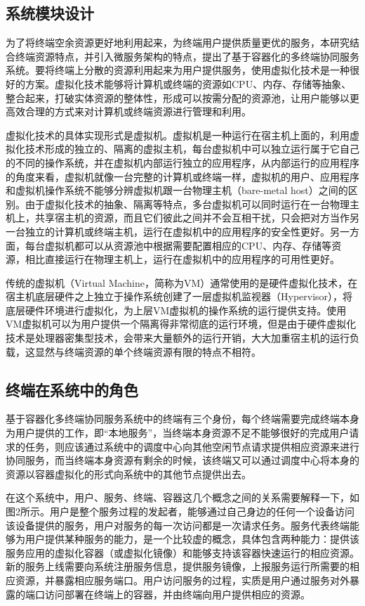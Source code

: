 \subsection{系统模块设计}
为了将终端空余资源更好地利用起来，为终端用户提供质量更优的服务，本研究结合终端资源特点，并引入微服务架构的特点，提出了基于容器化的多终端协同服务系统。要将终端上分散的资源利用起来为用户提供服务，使用虚拟化技术是一种很好的方案。虚拟化技术能够将计算机或终端的资源如CPU、内存、存储等抽象、整合起来，打破实体资源的整体性，形成可以按需分配的资源池，让用户能够以更高效合理的方式来对计算机或终端资源进行管理和利用。

虚拟化技术的具体实现形式是虚拟机。虚拟机是一种运行在宿主机上面的，利用虚拟化技术形成的独立的、隔离的虚拟主机，每台虚拟机中可以独立运行属于它自己的不同的操作系统，并在虚拟机内部运行独立的应用程序，从内部运行的应用程序的角度来看，虚拟机就像一台完整的计算机或终端一样，虚拟机的用户、应用程序和虚拟机操作系统不能够分辨虚拟机跟一台物理主机（bare-metal host）之间的区别。由于虚拟化技术的抽象、隔离等特点，多台虚拟机可以同时运行在一台物理主机上，共享宿主机的资源，而且它们彼此之间并不会互相干扰，只会把对方当作另一台独立的计算机或终端主机，运行在虚拟机中的应用程序的安全性更好。另一方面，每台虚拟机都可以从资源池中根据需要配置相应的CPU、内存、存储等资源，相比直接运行在物理主机上，运行在虚拟机中的应用程序的可用性更好。

传统的虚拟机（Virtual Machine，简称为VM）通常使用的是硬件虚拟化技术，在宿主机底层硬件之上独立于操作系统创建了一层虚拟机监视器（Hypervisor），将底层硬件环境进行虚拟化，为上层VM虚拟机的操作系统的运行提供支持。使用VM虚拟机可以为用户提供一个隔离得非常彻底的运行环境，但是由于硬件虚拟化技术是处理器密集型技术，会带来大量额外的运行开销，大大加重宿主机的运行负载，这显然与终端资源的单个终端资源有限的特点不相符。

\subsection{终端在系统中的角色}

基于容器化多终端协同服务系统中的终端有三个身份，每个终端需要完成终端本身为用户提供的工作，即“本地服务”，当终端本身资源不足不能够很好的完成用户请求的任务，则应该通过系统中的调度中心向其他空闲节点请求提供相应资源来进行协同服务，而当终端本身资源有剩余的时候，该终端又可以通过调度中心将本身的资源以容器虚拟化的形式向系统中的其他节点提供出去。

在这个系统中，用户、服务、终端、容器这几个概念之间的关系需要解释一下，如图2所示。用户是整个服务过程的发起者，能够通过自己身边的任何一个设备访问该设备提供的服务，用户对服务的每一次访问都是一次请求任务。服务代表终端能够为用户提供某种服务的能力，是一个比较虚的概念，具体包含两种能力：提供该服务应用的虚拟化容器（或虚拟化镜像）和能够支持该容器快速运行的相应资源。新的服务上线需要向系统注册服务信息，提供服务镜像，上报服务运行所需要的相应资源，并暴露相应服务端口。用户访问服务的过程，实质是用户通过服务对外暴露的端口访问部署在终端上的容器，并由终端向用户提供相应的资源。



